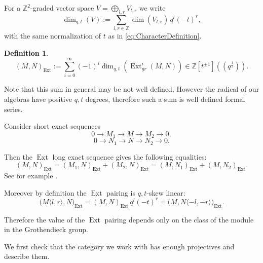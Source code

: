 \documentclass[10pt]{amsart}
\newcommand{\sh}[2]{\langle #1,#2\rangle}
\newtheorem{definition}[theorem]{Definition}
\DeclareMathOperator{\Ext}{Ext}
\begin{document}
	For a $\mathbb{Z}^2$-graded vector space $V=\bigoplus_{l,r}V_{l,r}$ we write
	\begin{equation*}\label{eq:GradedSuperdimension}
		\dim_{q,t}(V):=\sum_{l,r \in \mathbb{Z}}\dim(V_{l,r})\,q^l(-t)^r,
	\end{equation*}
	with the same normalization of $t$ as in \eqref{eq:CharacterDefinition}.
	
	\begin{definition}
		\[(M,N)_{\Ext}:=\sum_{i=0}^{\infty}(-1)^i\dim_{q,t}(\Ext^{i}_{gr}(M ,N)) \in \mathbb{Z}\left[t^{\pm 1}\right]((q^{\frac{1}{2}})).\]
	\end{definition}
	
	Note that this sum in general may be not well defined. However the radical of our algebras have positive $q,t$ degrees, therefore such a sum is well defined formal series.
	
	Consider short exact sequences
	\[0 \rightarrow M_1 \rightarrow M \rightarrow M_2 \rightarrow 0,\]
	\[0 \rightarrow N_1 \rightarrow N \rightarrow N_2 \rightarrow 0.\]
	
	Then the $\Ext$ long exact sequence gives the following equalities:
	\begin{equation*}\label{eq:ExtPairingShortDecomposition}
		(M,N)_{\Ext}=(M_1,N)_{\Ext}+(M_2,N)_{\Ext}=(M,N_1)_{\Ext}+(M,N_2)_{\Ext}.
	\end{equation*}
    See for example \cite{weibel1994introduction}.
	
	Moreover by definition the $\Ext$ pairing is $q,t$-skew linear:
	\begin{equation*}
		\bigl(M\sh{l}{r},N\bigr)_{\Ext}=(M,N)_{\Ext}\,q^l(-t)^r=\bigl(M,N\sh{-l}{-r}\bigr)_{\Ext}.
	\end{equation*}
	
	Therefore the value of the $\Ext$ pairing depends only on the class of the module in the Grothendieck group.
	
	We first check that the category we work with has enough projectives and describe them.
	
\end{document}

